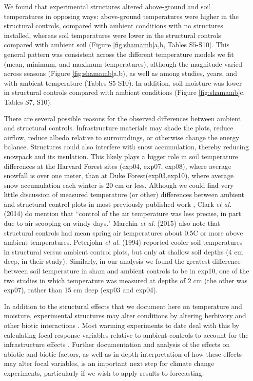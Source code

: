 \documentclass{article}
\begin{document}
\par We found that experimental structures altered above-ground and soil temperatures in opposing ways: above-ground temperatures were higher in the structural controls, compared with ambient conditions with no structures installed, whereas soil temperatures were lower in the structural controls compared with ambient soil (Figure \ref{fig:shamamb}a,b, Tables S5-S10). This general pattern was consistent across the different temperature models we fit (mean, minimum, and maximum temperatures), although the magnitude varied across seasons (Figure \ref{fig:shamamb}a,b), as well as among studies, years, and with ambient temperature (Tables S5-S10). In addition, soil moisture was lower in structural controls compared with ambient conditions (Figure \ref{fig:shamamb}c, Tables S7, S10). 
\par There are several possible reasons for the observed differences between ambient and structural controls. Infrastructure materials may shade the plots, reduce airflow, reduce albedo relative to surroundings, or otherwise change the energy balance. Structures could also interfere with snow accumulation, thereby reducing snowpack and its insulation. This likely plays a bigger role in soil temperature differences at the Harvard Forest sites (exp04, exp07, exp08), where average snowfall is over one meter, than at Duke Forest(exp03,exp10), where average snow accumulation each winter is 20 cm or less. Although we could find very little discussion of measured temperature (or other) differences between ambient and structural control plots in most previously published work \citep[e.g.,][]{farnsworth1995,pelini2011,clark2014a,clark2014b}, Clark \textit{et al.} (2014) do mention that ``control of the air temperature was less precise, in part due to air scooping on windy days." Marchin \textit{et al.} (2015) also note that structural controls had mean spring air temperatures about  0.5\degree C or more above ambient temperatures. Peterjohn \textit{et al.} (1994) reported cooler soil temperatures in structural versus ambient control plots, but only at shallow soil depths (4 cm deep, in their study). Similarly, in our analysis we found the greatest difference between soil temperature in sham and ambient controls to be in exp10, one of the two studies in which temperature was measured at depths of 2 cm (the other was exp07), rather than 15 cm deep (exp03 and exp04). 
\par In addition to the structural effects that we document here on temperature and moisture, experimental structures may alter conditions by altering herbivory and other biotic interactions \citep{kennedy1995,moise2010,wolkovich2012,hoeppner2012}. Most warming experiments to date deal with this by calculating focal response variables relative to ambient controls to account for the infrastructure effects \citep [e.g.,][]{marchin2015}. Further documentation and analysis of the effects on abiotic and biotic factors, as well as in depth interpretation of how these effects may alter focal variables, is an important next step for climate change experiments, particularly if we wish to apply results to forecasting.
\end{document}

